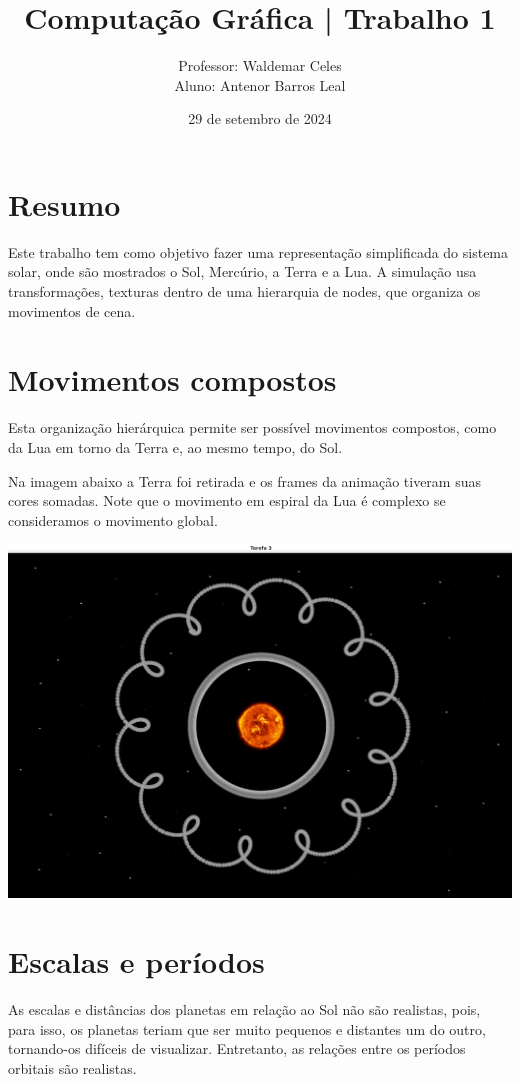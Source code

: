 \documentclass[11pt, a4paper]{article}
\title{Computação Gráfica | Trabalho 1}
\author{Professor: Waldemar Celes\\
Aluno: Antenor Barros Leal}
\date{29 de setembro de 2024}
\begin{document}
\maketitle

\section {Resumo}
Este trabalho tem como objetivo fazer uma representação simplificada do sistema 
solar, onde são mostrados o Sol, Mercúrio, a Terra e a Lua. A simulação 
usa transformações, texturas dentro de uma hierarquia de nodes, que organiza os
movimentos de cena.

\section {Movimentos compostos}
Esta organização hierárquica permite ser possível movimentos compostos, como da Lua em
torno da Terra e, ao mesmo tempo, do Sol.

Na imagem abaixo a Terra foi retirada e os frames da animação tiveram suas cores
somadas. Note que o movimento em espiral da Lua é complexo se consideramos o 
movimento global.

\includegraphics[width=0.8\linewidth]{overlay.png}


\section {Escalas e períodos}

As escalas e distâncias dos planetas em relação ao Sol não são realistas, pois, 
para isso, os planetas teriam que ser muito pequenos e distantes um do outro, 
tornando-os difíceis de visualizar. Entretanto, as relações entre os períodos 
orbitais são realistas.
\end{document}
